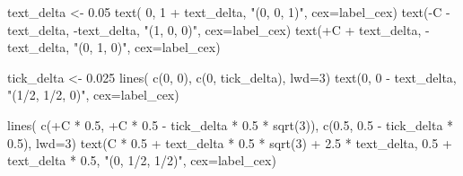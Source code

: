 \documentclass[
  letterpaper,
  DIV=11,
  numbers=noendperiod]{scrartcl}
\newenvironment{Shaded}{\begin{snugshade}}{\end{snugshade}}
\newcommand{\AttributeTok}[1]{\textcolor[rgb]{0.40,0.45,0.13}{#1}}
\newcommand{\DecValTok}[1]{\textcolor[rgb]{0.68,0.00,0.00}{#1}}
\newcommand{\FloatTok}[1]{\textcolor[rgb]{0.68,0.00,0.00}{#1}}
\newcommand{\FunctionTok}[1]{\textcolor[rgb]{0.28,0.35,0.67}{#1}}
\newcommand{\NormalTok}[1]{\textcolor[rgb]{0.00,0.23,0.31}{#1}}
\newcommand{\OtherTok}[1]{\textcolor[rgb]{0.00,0.23,0.31}{#1}}
\newcommand{\SpecialCharTok}[1]{\textcolor[rgb]{0.37,0.37,0.37}{#1}}
\newcommand{\StringTok}[1]{\textcolor[rgb]{0.13,0.47,0.30}{#1}}
\begin{document}
\begin{Shaded}
\begin{Highlighting}[]
\NormalTok{  text\_delta }\OtherTok{\textless{}{-}} \FloatTok{0.05}
  \FunctionTok{text}\NormalTok{( }\DecValTok{0}\NormalTok{, }\DecValTok{1} \SpecialCharTok{+}\NormalTok{ text\_delta, }\StringTok{"(0, 0, 1)"}\NormalTok{, }\AttributeTok{cex=}\NormalTok{label\_cex)}
  \FunctionTok{text}\NormalTok{(}\SpecialCharTok{{-}}\NormalTok{C }\SpecialCharTok{{-}}\NormalTok{ text\_delta, }\SpecialCharTok{{-}}\NormalTok{text\_delta, }\StringTok{"(1, 0, 0)"}\NormalTok{, }\AttributeTok{cex=}\NormalTok{label\_cex)}
  \FunctionTok{text}\NormalTok{(}\SpecialCharTok{+}\NormalTok{C }\SpecialCharTok{+}\NormalTok{ text\_delta, }\SpecialCharTok{{-}}\NormalTok{text\_delta, }\StringTok{"(0, 1, 0)"}\NormalTok{, }\AttributeTok{cex=}\NormalTok{label\_cex)}

\NormalTok{  tick\_delta }\OtherTok{\textless{}{-}} \FloatTok{0.025}
  \FunctionTok{lines}\NormalTok{( }\FunctionTok{c}\NormalTok{(}\DecValTok{0}\NormalTok{, }\DecValTok{0}\NormalTok{), }\FunctionTok{c}\NormalTok{(}\DecValTok{0}\NormalTok{, tick\_delta), }\AttributeTok{lwd=}\DecValTok{3}\NormalTok{)}
  \FunctionTok{text}\NormalTok{(}\DecValTok{0}\NormalTok{, }\DecValTok{0} \SpecialCharTok{{-}}\NormalTok{ text\_delta, }\StringTok{"(1/2, 1/2, 0)"}\NormalTok{, }\AttributeTok{cex=}\NormalTok{label\_cex)}

  \FunctionTok{lines}\NormalTok{( }\FunctionTok{c}\NormalTok{(}\SpecialCharTok{+}\NormalTok{C }\SpecialCharTok{*} \FloatTok{0.5}\NormalTok{, }\SpecialCharTok{+}\NormalTok{C }\SpecialCharTok{*} \FloatTok{0.5} \SpecialCharTok{{-}}\NormalTok{ tick\_delta }\SpecialCharTok{*} \FloatTok{0.5} \SpecialCharTok{*} \FunctionTok{sqrt}\NormalTok{(}\DecValTok{3}\NormalTok{)),}
         \FunctionTok{c}\NormalTok{(}\FloatTok{0.5}\NormalTok{, }\FloatTok{0.5} \SpecialCharTok{{-}}\NormalTok{ tick\_delta }\SpecialCharTok{*} \FloatTok{0.5}\NormalTok{), }\AttributeTok{lwd=}\DecValTok{3}\NormalTok{)}
  \FunctionTok{text}\NormalTok{(C }\SpecialCharTok{*} \FloatTok{0.5} \SpecialCharTok{+}\NormalTok{ text\_delta }\SpecialCharTok{*} \FloatTok{0.5} \SpecialCharTok{*} \FunctionTok{sqrt}\NormalTok{(}\DecValTok{3}\NormalTok{) }\SpecialCharTok{+} \FloatTok{2.5} \SpecialCharTok{*}\NormalTok{ text\_delta,}
       \FloatTok{0.5} \SpecialCharTok{+}\NormalTok{ text\_delta }\SpecialCharTok{*} \FloatTok{0.5}\NormalTok{, }\StringTok{"(0, 1/2, 1/2)"}\NormalTok{, }\AttributeTok{cex=}\NormalTok{label\_cex)}


\end{Highlighting}
\end{Shaded}
\end{document}
